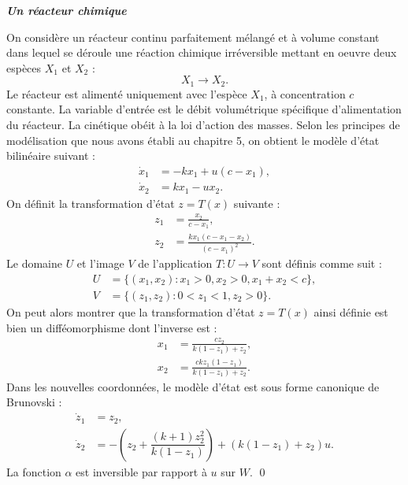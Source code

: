 \begin{exemple}{\bf \em Un réacteur chimique \label{exreachim} }
 
On considère un réacteur continu parfaitement mélangé et à volume
constant dans lequel se déroule une réaction chimique irréversible mettant
 en oeuvre deux espèces $X_1$ et $X_2$ :
 $$
 X_1 \longrightarrow X_2.
 $$
 Le réacteur est alimenté uniquement avec l'espèce $X_1$, à concentration
 $c$ constante.  La variable d'entrée est le débit volumétrique spécifique
 d'alimentation du réacteur.  La cinétique obéit à la loi d'action des
 masses.  Selon les principes de modélisation que nous avons établi au
 chapitre 5, on obtient le modèle d'état bilinéaire suivant :
 \begin{equation*} \begin{split}
 \dot x_1 &= -kx_1 + u (c-x_1),\\
 \dot x_2 &= kx_1 - ux_2.
 \end{split} \end{equation*}
 On définit la transformation d'état $z = T(x)$ suivante :
 \begin{equation*} \begin{split}
 z_1 &= \frac{x_2}{c-x_1},\\
 z_2 &= \frac{kx_1(c-x_1-x_2)}{(c-x_1)^2}.
 \end{split} \end{equation*}
 Le domaine $U$ et l'image $V$ de l'application $T : U \longrightarrow V$
 sont définis comme suit :
 \begin{equation*} \begin{split}
 U &= \{(x_1, x_2) : x_1 > 0, x_2 > 0, x_1+x_2 < c \},\\
 V &= \{(z_1,z_2) : 0<z_1 <1, z_2>0 \}.
 \end{split} \end{equation*}
On peut
 alors montrer que la transformation d'état $z = T(x)$ ainsi définie est bien
 un difféomorphisme dont l'inverse est :
 \begin{equation*} \begin{split} 
 x_1 &= \frac{cz_2}{k(1-z_1)+z_2},\\
 x_2 &= \frac{ckz_1(1-z_1)}{k(1-z_1)+z_2}.
 \end{split} \end{equation*}
 Dans les nouvelles coordonnées, le modèle d'état est sous forme canonique de
 Brunovski :
 \begin{equation*} \begin{split} 
 \dot z_1 &= z_2,\\
 \dot z_2 &= -\left( z_2 + \dfrac{(k+1)z^2_2}{k(1-z_1)} \right) + (k(1-z_1) + z_2)u.
 \end{split} \end{equation*} 
La fonction $\alpha$ est inversible par rapport à $u$ sur $W$. \qed
\end{exemple}

